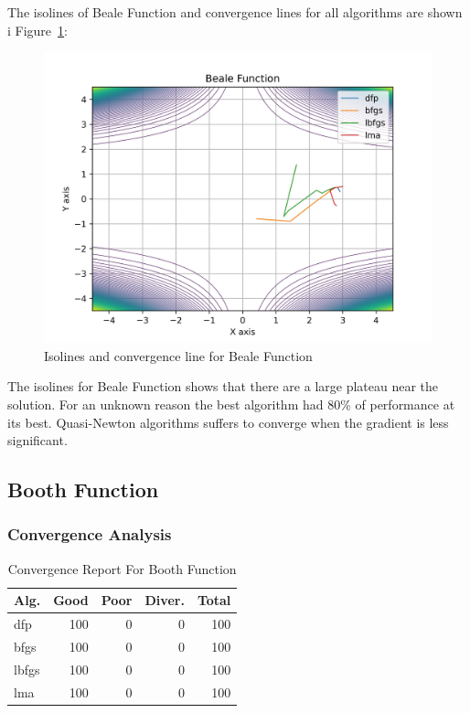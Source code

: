 \documentclass[conference]{IEEEtran}
\begin{document}
The isolines of Beale Function and convergence lines for all algorithms are shown i Figure~\ref{fig:beale}:\begin{figure}[H]
\centering
\caption{Isolines and convergence line for Beale Function}
\label{fig:beale}
\includegraphics[scale=0.5]{images/beale.jpg}
\end{figure}
The isolines for Beale Function shows that there are a large plateau near the solution. For an unknown reason the best algorithm had 80\% of performance at its best. Quasi-Newton algorithms suffers to converge when the gradient is less significant.\subsection{Booth Function}
\label{booth2D}

\subsubsection{Convergence Analysis}
\label{convergencebooth2D}

\begin{table}[H]
\centering
\caption{Convergence Report For Booth Function}
\label{convergence:booth}
\begin{tabular}{lrrrr}
\toprule
 Alg. &  Good &  Poor &  Diver. &  Total \\
\midrule
  dfp &   100 &     0 &       0 &    100 \\
 bfgs &   100 &     0 &       0 &    100 \\
lbfgs &   100 &     0 &       0 &    100 \\
  lma &   100 &     0 &       0 &    100 \\
\bottomrule
\end{tabular}
\end{table}
\end{document}
